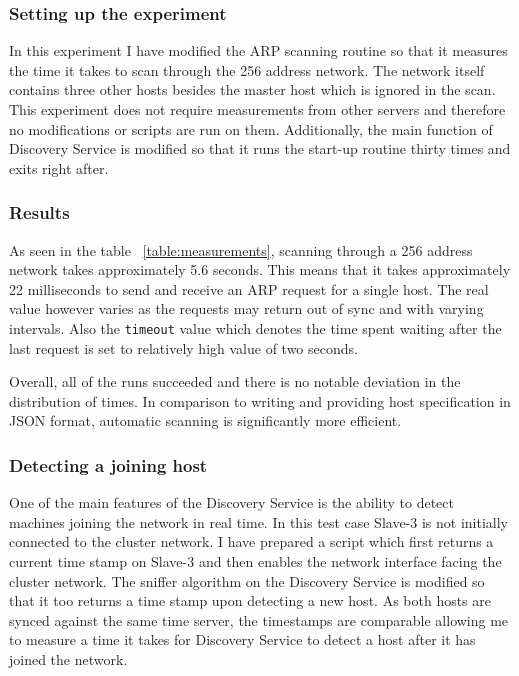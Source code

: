\subsubsection*{Setting up the experiment}

 In this experiment I have modified the ARP scanning routine so that it measures the time it takes to scan through the 256 address network. The network itself contains three other hosts besides the master host which is ignored in the scan. This experiment does not require measurements from other servers and therefore no modifications or scripts are run on them. Additionally, the main function of Discovery Service is modified so that it runs the start-up routine thirty times and exits right after.

\subsubsection*{Results}

As seen in the table ~\ref{table:measurements}, scanning through a 256 address network takes approximately 5.6 seconds. This means that it takes approximately 22 milliseconds to send and receive an ARP request for a single host. The real value however varies as the requests may return out of sync and with varying intervals. Also the \verb|timeout| value which denotes the time spent waiting after the last request is set to relatively high value of two seconds.

Overall, all of the runs succeeded and there is no notable deviation in the distribution of times. In comparison to writing and providing host specification in JSON format, automatic scanning is significantly more efficient.

\subsubsection{Detecting a joining host} \label{joining_host}

One of the main features of the Discovery Service is the ability to detect machines joining the network in real time. In this test case Slave-3 is not initially connected to the cluster network. I have prepared a script which first returns a current time stamp on Slave-3 and then enables the network interface facing the cluster network. The sniffer algorithm on the Discovery Service is modified so that it too returns a time stamp upon detecting  a new host. As both hosts are synced against the same time server, the timestamps are comparable allowing me to measure a time it takes for Discovery Service to detect a host after it has joined the network.

